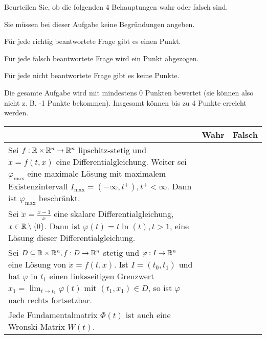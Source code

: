 \begin{Problem}
	Beurteilen Sie, ob die folgenden 4 Behauptungen wahr oder falsch sind.
	
	Sie müssen bei dieser Aufgabe keine Begründungen angeben.
	
	Für jede richtig beantwortete Frage gibt es einen Punkt.
	
	Für jede falsch beantwortete Frage wird ein Punkt abgezogen.
	
	Für jede nicht beantwortete Frage gibt es keine Punkte.
	
	Die gesamte Aufgabe wird mit mindestens 0 Punkten bewertet (sie können also nicht z. B. -1 Punkte bekommen). Insgesamt können bis zu 4 Punkte erreicht werden.
	
		\begin{tabularx}{\textwidth}{X|p{2cm}|p{2cm}|}
	& Wahr & Falsch \\\hline
	Sei $f : \mathbb{R} \times \mathbb{R}^n\to  \mathbb{R}^n$ lipschitz-stetig und $\dot{x} = f (t, x)$ eine Differentialgleichung.
	Weiter sei $\varphi_\text{max}$ eine maximale Lösung mit maximalem Existenzintervall	$I_\text{max} = (-\infty, t^+ ), t^+ < \infty$. Dann ist $\varphi_\text{max}$ beschränkt. & & \\\hline
	Sei $\ddot{x} = \frac{\dot{x}-1}{x}$ eine skalare Differentialgleichung, $x \in \mathbb{R} \setminus \{0\}$. Dann ist $\varphi(t) = t \ln(t), t > 1$, eine Lösung dieser Differentialgleichung. & & \\\hline
	Sei $D \subseteq \mathbb{R} \times \mathbb{R}^n , f : D \to \mathbb{R}^n$ stetig und $\varphi : I \to \mathbb{R}^n$ eine Lösung von $\dot{x} = f (t, x)$. Ist $I = (t_0, t_1)$ und hat $\varphi$ in $t_1$ einen linksseitigen Grenzwert $x_1 = \lim_{t\to t_1} \varphi(t)$ mit $(t_1 , x_1 ) \in D$, so ist $\varphi$ nach rechts fortsetzbar. & & \\\hline
	Jede Fundamentalmatrix $\Phi(t)$ ist auch eine Wronski-Matrix $W(t)$. & & \\\hline
	\end{tabularx}
\end{Problem}
